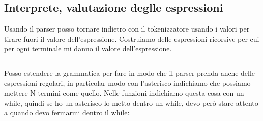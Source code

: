 \subsection{Interprete, valutazione deglle espressioni}
Usando il parser posso tornare indietro con il tokenizzatore usando i valori per tirare fuori il valore dell'espressione. Costruiamo delle espressioni ricorsive per cui per ogni terminale mi danno il valore dell'espressione.

\begin{lstlisting}

\end{lstlisting}

Posso estendere la grammatica per fare in modo che il parser prenda anche delle espressioni regolari, in particolar modo con l'asterisco indichiamo che possiamo mettere N termini come quello. Nelle funzioni indichiamo questa cosa con un while, quindi se ho un asterisco lo metto dentro un while, devo però stare attento a quando devo fermarmi dentro il while:
\begin{lstlisting}

\end{lstlisting}

